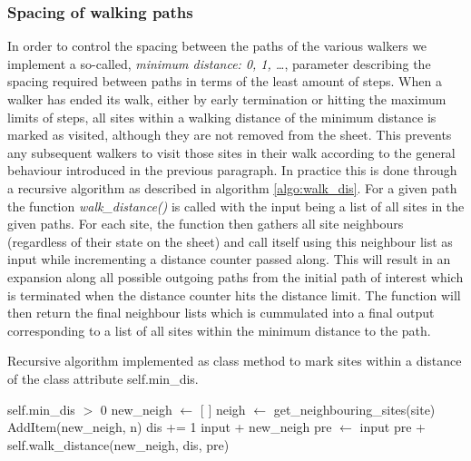 \subsubsection{Spacing of walking paths} %
In order to control the spacing between the paths of the various walkers we
implement a so-called, \textit{minimum distance: 0, 1, \ldots}, parameter
describing the spacing required between paths in terms of the least amount of
steps. When a walker has ended its walk, either by early termination or hitting
the maximum limits of steps, all sites within a walking distance of the minimum
distance is marked as visited, although they are not removed from the sheet.
This prevents any subsequent walkers to visit those sites in their walk
according to the general behaviour introduced in the previous paragraph. In
practice this is done through a recursive algorithm as described in algorithm
\cref{algo:walk_dis}. For a given path the function \textit{walk\_distance()} is called with the input being a list of all sites in the given paths. For each site, the function then gathers all site neighbours (regardless of their state on the sheet) and call itself using this neighbour list as input while incrementing a
distance counter passed along. This will result in an expansion along all
possible outgoing paths from the initial path of interest which is terminated
when the distance counter hits the distance limit. The function will
then return the final neighbour lists which is cummulated into a final output
corresponding to a list of all sites within the minimum distance to the path.

\begin{algorithm}[H]
  \caption{Recursive algorithm implemented as class method to mark sites within a distance of the class attribute self.min\_dis.}
  \label{algo:walk_dis}
  \begin{algorithmic}[1]
    \Require self.min\_dis $>$ 0 
      \State new\_neigh $\gets$ [ ] 
        \State neigh $\gets$ get\_neighbouring\_sites(site) 
           
            \State AddItem(new\_neigh, n)
          \EndIf
        \EndFor
      \EndFor
      \State dis += 1 
       
        \State \Return input + new\_neigh 
      \Else {}
        \State pre $\gets$ input
        \State \Return pre +  self.walk\_distance(new\_neigh, dis, pre)
      \EndIf
    \EndFunction
  \end{algorithmic}
\end{algorithm}

